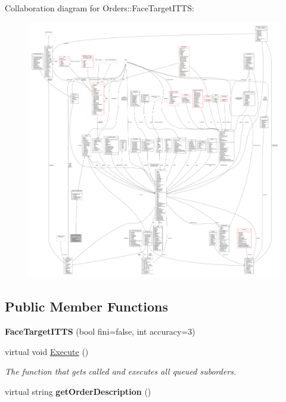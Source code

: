 Collaboration diagram for Orders\+:\+:Face\+Target\+I\+T\+TS\+:
\nopagebreak
\begin{figure}[H]
\begin{center}
\leavevmode
\includegraphics[width=350pt]{d0/dc9/classOrders_1_1FaceTargetITTS__coll__graph}
\end{center}
\end{figure}
\subsection*{Public Member Functions}
\begin{DoxyCompactItemize}
\item 
{\bfseries Face\+Target\+I\+T\+TS} (bool fini=false, int accuracy=3)\hypertarget{classOrders_1_1FaceTargetITTS_a292361db1155fbaa4afd275d4c257391}{}\label{classOrders_1_1FaceTargetITTS_a292361db1155fbaa4afd275d4c257391}

\item 
virtual void \hyperlink{classOrders_1_1FaceTargetITTS_a8511f57b6a13e09d1a65cb5e9106fe01}{Execute} ()\hypertarget{classOrders_1_1FaceTargetITTS_a8511f57b6a13e09d1a65cb5e9106fe01}{}\label{classOrders_1_1FaceTargetITTS_a8511f57b6a13e09d1a65cb5e9106fe01}

\begin{DoxyCompactList}\small\item\em The function that gets called and executes all queued suborders. \end{DoxyCompactList}\item 
virtual string {\bfseries get\+Order\+Description} ()\hypertarget{classOrders_1_1FaceTargetITTS_a88fdf81661fdb89f7b861d80a03eafbe}{}\label{classOrders_1_1FaceTargetITTS_a88fdf81661fdb89f7b861d80a03eafbe}

\end{DoxyCompactItemize}
